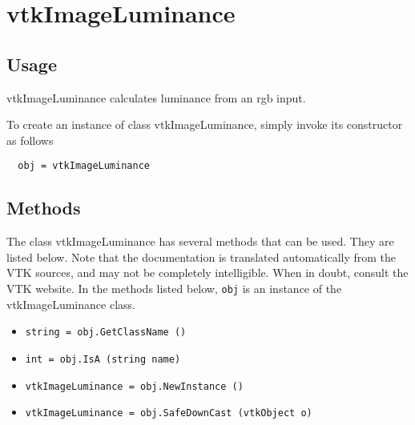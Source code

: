 \section{vtkImageLuminance}

\subsection{Usage}

 vtkImageLuminance calculates luminance from an rgb input.

To create an instance of class vtkImageLuminance, simply
invoke its constructor as follows
\begin{verbatim}
  obj = vtkImageLuminance
\end{verbatim}
\subsection{Methods}

The class vtkImageLuminance has several methods that can be used.
  They are listed below.
Note that the documentation is translated automatically from the VTK sources,
and may not be completely intelligible.  When in doubt, consult the VTK website.
In the methods listed below, \verb|obj| is an instance of the vtkImageLuminance class.
\begin{itemize}
\item  \verb|string = obj.GetClassName ()|

\item  \verb|int = obj.IsA (string name)|

\item  \verb|vtkImageLuminance = obj.NewInstance ()|

\item  \verb|vtkImageLuminance = obj.SafeDownCast (vtkObject o)|

\end{itemize}
